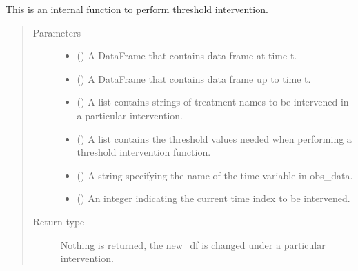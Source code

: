 \documentclass[letterpaper,10pt,english]{sphinxmanual}
\begin{document}
\begin{fulllineitems}
\label{\detokenize{Specifications/Intervention:pygformula.parametric_gformula.interventions.threshold}}
\sphinxAtStartPar
This is an internal function to perform threshold intervention.
\begin{quote}\begin{description}
\item[{Parameters}] \leavevmode\begin{itemize}
\item {} 
\sphinxAtStartPar
{} () \textendash{} A DataFrame that contains data frame at time t.

\item {} 
\sphinxAtStartPar
{} () \textendash{} A DataFrame that contains data frame up to time t.

\item {} 
\sphinxAtStartPar
{} () \textendash{} A list contains strings of treatment names to be intervened in a particular intervention.

\item {} 
\sphinxAtStartPar
{} () \textendash{} A list contains the threshold values needed when performing a threshold intervention function.

\item {} 
\sphinxAtStartPar
{} () \textendash{} A string specifying the name of the time variable in obs\_data.

\item {} 
\sphinxAtStartPar
{} () \textendash{} An integer indicating the current time index to be intervened.

\end{itemize}

\item[{Return type}] \leavevmode
\sphinxAtStartPar
Nothing is returned, the new\_df is changed under a particular intervention.

\end{description}\end{quote}

\end{fulllineitems}
\end{document}
